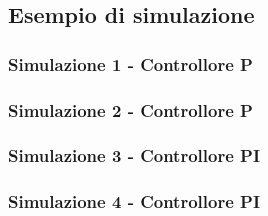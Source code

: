 \documentclass[../main.tex]{subfiles}
\begin{document}
\subsection{Esempio di simulazione}

\subsubsection{Simulazione 1 - Controllore P}

\subsubsection{Simulazione 2 - Controllore P}

\subsubsection{Simulazione 3 - Controllore PI}

\subsubsection{Simulazione 4 - Controllore PI}
\end{document}
